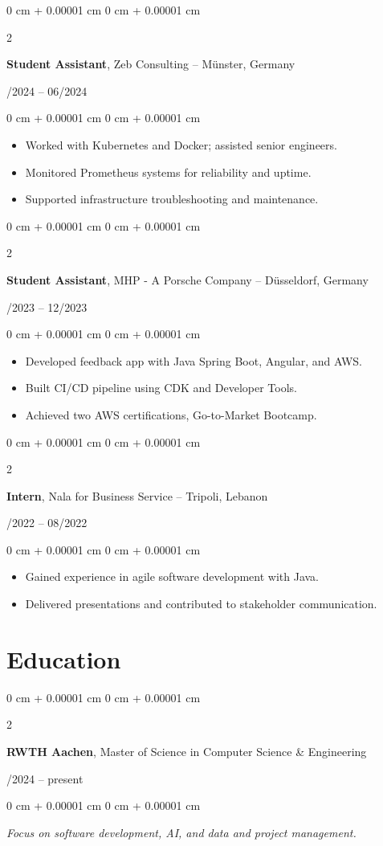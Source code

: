 \documentclass[10pt, letterpaper]{article}
\newenvironment{highlights}{
    \begin{itemize}[
        topsep=0.10 cm,
        parsep=0.10 cm,
        partopsep=0pt,
        itemsep=0pt,
        leftmargin=0 cm + 10pt
    ]
}{
    \end{itemize}
} %
\newenvironment{onecolentry}{
    \begin{adjustwidth}{
        0 cm + 0.00001 cm
    }{
        0 cm + 0.00001 cm
    }
}{
    \end{adjustwidth}
} %
\newenvironment{twocolentry}[2][]{
    \onecolentry
    \def\secondColumn{#2}
    \setcolumnwidth{\fill, 4.5 cm}
    \begin{paracol}{2}
}{
    \switchcolumn \raggedleft \secondColumn
    \end{paracol}
    \endonecolentry
} %
\begin{document}
\vspace{0.2cm}

\begin{twocolentry}{01/2024 -- 06/2024}
\textbf{Student Assistant}, Zeb Consulting -- Münster, Germany
\end{twocolentry}
\begin{onecolentry}
\begin{highlights}
\item Worked with Kubernetes and Docker; assisted senior engineers.
\item Monitored Prometheus systems for reliability and uptime.
\item Supported infrastructure troubleshooting and maintenance.
\end{highlights}
\end{onecolentry}

\vspace{0.2cm}

\begin{twocolentry}{03/2023 -- 12/2023}
\textbf{Student Assistant}, MHP - A Porsche Company -- Düsseldorf, Germany
\end{twocolentry}
\begin{onecolentry}
\begin{highlights}
\item Developed feedback app with Java Spring Boot, Angular, and AWS.
\item Built CI/CD pipeline using CDK and Developer Tools.
\item Achieved two AWS certifications, Go-to-Market Bootcamp.
\end{highlights}
\end{onecolentry}

\vspace{0.2cm}

\begin{twocolentry}{05/2022 -- 08/2022}
\textbf{Intern}, Nala for Business Service -- Tripoli, Lebanon
\end{twocolentry}
\begin{onecolentry}
\begin{highlights}
\item Gained experience in agile software development with Java.
\item Delivered presentations and contributed to stakeholder communication.
\end{highlights}
\end{onecolentry}

  \section{Education}
\begin{twocolentry}{04/2024 -- present}
\textbf{RWTH Aachen}, Master of Science in Computer Science \& Engineering
\end{twocolentry}
\begin{onecolentry}
\textit{Focus on software development, AI, and data and project management.}
\end{onecolentry}
\end{document}
